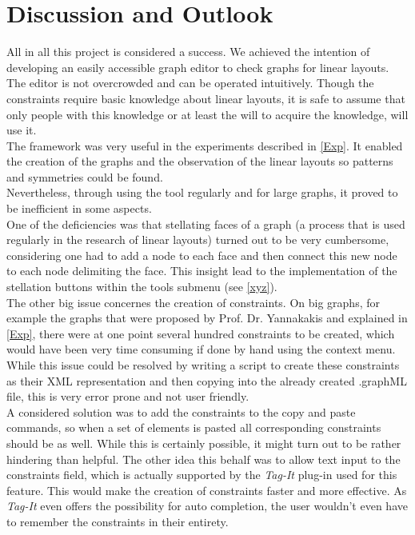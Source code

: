 
\chapter{Discussion and Outlook}
  \label{Discussion}

All in all this project is considered a success. We achieved the intention of developing an easily accessible graph editor to check graphs for linear layouts. 
The editor is not overcrowded and can be operated intuitively. Though the constraints require basic knowledge about linear layouts, it is safe to assume that only people with this knowledge or at least the will to acquire the knowledge, will use it.\\
The framework was very useful in the experiments described in \autoref{Exp}. It enabled the creation of the graphs and the observation of the linear layouts so patterns and symmetries could be found.\\ 
Nevertheless, through using the tool regularly and for large graphs, it proved to be inefficient in some aspects.\\
One of the deficiencies was that stellating faces of a graph (a process that is used regularly in the research of linear layouts) turned out to be very cumbersome, considering one had to add a node to each face and then connect this new node to each node delimiting the face. This insight lead to the implementation of the stellation buttons within the tools submenu (see \autoref{xyz}).\\
The other big issue concernes the creation of constraints. On big graphs, for example the graphs that were proposed by Prof. Dr. Yannakakis \cite{yannakakis1986four} and explained in \autoref{Exp}, there were at one point several hundred constraints to be created, which would have been very time consuming if done by hand using the context menu. While this issue could be resolved by writing a script to create these constraints as their XML representation and then copying into the already created .graphML file, this is very error prone and not user friendly.\\
A considered solution was to add the constraints to the copy and paste commands, so when a set of elements is pasted all corresponding constraints should be as well. While this is certainly possible, it might turn out to be rather hindering than helpful. The other idea this behalf was to allow text input to the constraints field, which is actually supported by the \textit{Tag-It} plug-in used for this feature. This would make the creation of constraints faster and more effective. As \textit{Tag-It} even offers the possibility for auto completion, the user wouldn't even have to remember the constraints in their entirety. \\
